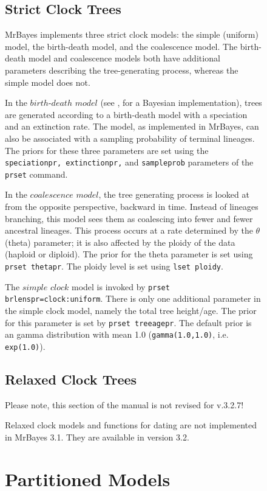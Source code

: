 \documentclass[12pt]{book}
\newcommand{\ttt}[1]{\texttt{#1}}
\begin{document}
\begin{figure}[h]
\subsection{Strict Clock Trees}

MrBayes implements three strict clock models: the simple (uniform) model, the birth-death model, and
the coalescence model. The birth-death model and coalescence models both have additional parameters
describing the tree-generating process, whereas the simple model does not.

In the $birth$-$death$ $model$ (see \citet{yang97b}, for a Bayesian implementation), trees are
generated according to a birth-death model with a speciation and an extinction rate. The model, as
implemented in MrBayes, can also be associated with a sampling probability of terminal lineages.
The priors for these three parameters are set using the \ttt{speciationpr, extinctionpr,} and
\ttt{sampleprob} parameters of the \ttt{prset} command.

In the $coalescence$ $model$, the tree generating process is looked at from the opposite
perspective, backward in time. Instead of lineages branching, this model sees them as coalescing
into fewer and fewer ancestral lineages. This process occurs at a rate determined by the $\theta$
(theta) parameter; it is also affected by the ploidy of the data (haploid or diploid). The prior
for the theta parameter is set using \ttt{prset thetapr}. The ploidy level is set using \ttt{lset
ploidy}.

The $simple$ $clock$ model is invoked by \ttt{prset brlenspr=clock:uniform}. There is only one
additional parameter in the simple clock model, namely the total tree height/age. The prior for this
parameter is set by \ttt{prset treeagepr}. The default prior is an gamma distribution with
mean 1.0 (\ttt{gamma(1.0,1.0)}, i.e. \ttt{exp(1.0)}).

\subsection{Relaxed Clock Trees}
{\large\color{red} Please note, this section of the manual is not revised for v.3.2.7!}

Relaxed clock models and functions for dating are not implemented in MrBayes 3.1. They are
available in version 3.2.

\section{Partitioned Models}
\label{partitionedModels}


\end{figure}
\end{document}
